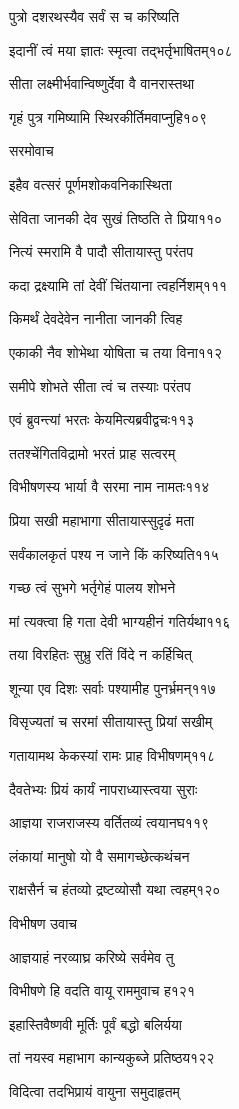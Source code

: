 पुत्रो दशरथस्यैव सर्वं स च करिष्यति

इदानीं त्वं मया ज्ञातः स्मृत्वा तद्भर्तृभाषितम्१०८

सीता लक्ष्मीर्भवान्विष्णुर्देवा वै वानरास्तथा

गृहं पुत्र गमिष्यामि स्थिरकीर्तिमवाप्नुहि१०९

सरमोवाच

इहैव वत्सरं पूर्णमशोकवनिकास्थिता

सेविता जानकी देव सुखं तिष्ठति ते प्रिया११०

नित्यं स्मरामि वै पादौ सीतायास्तु परंतप

कदा द्रक्ष्यामि तां देवीं चिंतयाना त्वहर्निशम्१११

किमर्थं देवदेवेन नानीता जानकी त्विह

एकाकी नैव शोभेथा योषिता च तया विना११२

समीपे शोभते सीता त्वं च तस्याः परंतप

एवं ब्रुवन्त्यां भरतः केयमित्यब्रवीद्वचः११३

ततश्चेंगितविद्रामो भरतं प्राह सत्वरम्

विभीषणस्य भार्या वै सरमा नाम नामतः११४

प्रिया सखी महाभागा सीतायास्सुदृढं मता

सर्वंकालकृतं पश्य न जाने किं करिष्यति११५

गच्छ त्वं सुभगे भर्तृगेहं पालय शोभने

मां त्यक्त्वा हि गता देवी भाग्यहीनं गतिर्यथा११६

तया विरहितः सुभ्रु रतिं विंदे न कर्हिचित्

शून्या एव दिशः सर्वाः पश्यामीह पुनर्भ्रमन्११७

विसृज्यतां च सरमां सीतायास्तु प्रियां सखीम्

गतायामथ केकस्यां रामः प्राह विभीषणम्११८

दैवतेभ्यः प्रियं कार्यं नापराध्यास्त्वया सुराः

आज्ञया राजराजस्य वर्तितव्यं त्वयानघ११९

लंकायां मानुषो यो वै समागच्छेत्कथंचन

राक्षसैर्न च हंतव्यो द्रष्टव्योसौ यथा त्वहम्१२०

विभीषण उवाच

आज्ञयाहं नरव्याघ्र करिष्ये सर्वमेव तु

विभीषणे हि वदति वायू राममुवाच ह१२१

इहास्तिवैष्णवी मूर्तिः पूर्वं बद्धो बलिर्यया

तां नयस्व महाभाग कान्यकुब्जे प्रतिष्ठय१२२

विदित्वा तदभिप्रायं वायुना समुदाहृतम्

